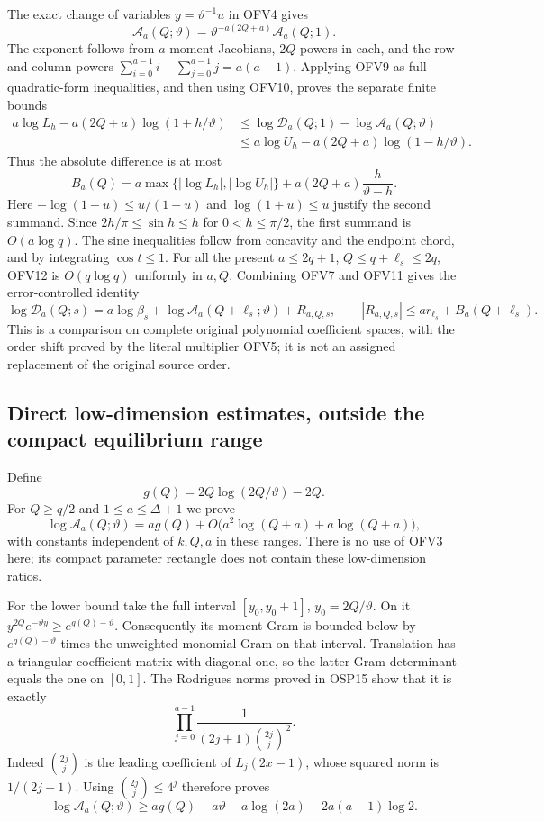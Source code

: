 \documentclass[11pt,a4paper]{article}
\begin{document}
The exact change of variables $y=\vartheta^{-1}u$ in OFV4 gives
\[
\mathcal A_a(Q;\vartheta)
=\vartheta^{-a(2Q+a)}\mathcal A_a(Q;1).
\tag{OFV10}
\]
The exponent follows from $a$ moment Jacobians, $2Q$ powers in
each, and the row and column powers
$\sum_{i=0}^{a-1}i+\sum_{j=0}^{a-1}j=a(a-1)$.
Applying OFV9 as full quadratic-form inequalities, and then using
OFV10, proves the separate finite bounds
\[
\begin{split}
a\log L_h-a(2Q+a)\log(1+h/\vartheta)
&\le\log\mathcal D_a(Q;1)-\log\mathcal A_a(Q;\vartheta)\\
&\le a\log U_h-a(2Q+a)\log(1-h/\vartheta).
\end{split}\tag{OFV11}
\]
Thus the absolute difference is at most
\[
B_a(Q)=a\max\{|\log L_h|,|\log U_h|\}
       +a(2Q+a)\frac{h}{\vartheta-h}.
\tag{OFV12}
\]
Here $-\log(1-u)\le u/(1-u)$ and $\log(1+u)\le u$
justify the second summand. Since
$2h/\pi\le\sin h\le h$ for $0<h\le\pi/2$,
the first summand is $O(a\log q)$.
The sine inequalities follow from concavity and the endpoint chord,
and by integrating $\cos t\le1$.
For all the present $a\le2q+1$, $Q\le q+\ell_s\le2q$,
OFV12 is $O(q\log q)$ uniformly in $a,Q$.
Combining OFV7 and OFV11 gives the error-controlled identity
\[
\log\mathcal D_a(Q;s)
=a\log\beta_s+\log\mathcal A_a(Q+\ell_s;\vartheta)
  +R_{a,Q,s},\qquad
|R_{a,Q,s}|\le ar_{\ell_s}+B_a(Q+\ell_s).
\tag{OFV13}
\]
This is a comparison on complete original polynomial coefficient
spaces, with the order shift proved by the literal multiplier
OFV5; it is not an assigned replacement of the original source order.

\subsection{Direct low-dimension estimates, outside the compact equilibrium range}

Define
\[
g(Q)=2Q\log(2Q/\vartheta)-2Q.
\tag{OFV14}
\]
For $Q\ge q/2$ and $1\le a\le\Delta+1$ we prove
\[
\log\mathcal A_a(Q;\vartheta)
=a g(Q)+O\bigl(a^2\log(Q+a)+a\log(Q+a)\bigr),
\tag{OFV15}
\]
with constants independent of $k,Q,a$ in these ranges.
There is no use of OFV3 here; its compact parameter rectangle
does not contain these low-dimension ratios.

For the lower bound take the full interval
$[y_0,y_0+1]$, $y_0=2Q/\vartheta$. On it
$y^{2Q}e^{-\vartheta y}\ge e^{g(Q)-\vartheta}$.
Consequently its moment Gram is bounded below by
$e^{g(Q)-\vartheta}$ times the unweighted monomial Gram on that interval.
Translation has a triangular coefficient matrix with diagonal one,
so the latter Gram determinant equals the one on $[0,1]$.
The Rodrigues norms proved in OSP15 show that it is exactly
\[
\prod_{j=0}^{a-1}
\frac1{(2j+1)\binom{2j}{j}^{\,2}}.
\]
Indeed $\binom{2j}{j}$ is the leading coefficient of
$L_j(2x-1)$, whose squared norm is $1/(2j+1)$.
Using $\binom{2j}{j}\le4^j$ therefore proves
\[
\log\mathcal A_a(Q;\vartheta)
\ge a g(Q)-a\vartheta-a\log(2a)-2a(a-1)\log2.
\tag{OFV16}
\]
\end{document}
